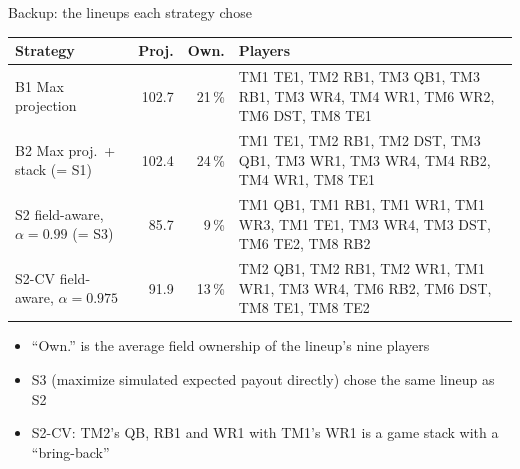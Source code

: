 




\begin{frame}{Backup: the lineups each strategy chose}
  \centering\footnotesize
  \begin{tabular}{@{}lrrp{}@{}}
    \toprule
    Strategy & Proj. & Own. & Players \\
    \midrule
    B1 Max projection & 102.7 & 21\,\% & TM1 TE1, TM2 RB1, TM3 QB1, TM3 RB1, TM3 WR4, TM4 WR1, TM6 WR2, TM6 DST, TM8 TE1 \\
    B2 Max proj.\ + stack (= S1) & 102.4 & 24\,\% & TM1 TE1, TM2 RB1, TM2 DST, TM3 QB1, TM3 WR1, TM3 WR4, TM4 RB2, TM4 WR1, TM8 TE1 \\
    S2 field-aware, $\alpha = 0.99$ (= S3) & 85.7 & 9\,\% & TM1 QB1, TM1 RB1, TM1 WR1, TM1 WR3, TM1 TE1, TM3 WR4, TM3 DST, TM6 TE2, TM8 RB2 \\
    S2-CV field-aware, $\alpha = 0.975$ & 91.9 & 13\,\% & TM2 QB1, TM2 RB1, TM2 WR1, TM1 WR1, TM3 WR4, TM6 RB2, TM6 DST, TM8 TE1, TM8 TE2 \\
    \bottomrule
  \end{tabular}
  \vspace{0.8em}
  \begin{itemize}
    \item ``Own.'' is the average field ownership of the lineup's nine players
    \item S3 (maximize simulated expected payout directly) chose the same lineup as S2
    \item S2-CV: TM2's QB, RB1 and WR1 with TM1's WR1 is a game stack with a ``bring-back''
  \end{itemize}
\end{frame}

